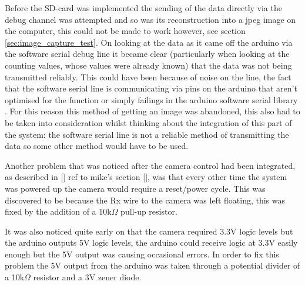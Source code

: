 Before the SD-card was implemented the sending of the data directly via the debug channel was attempted and so was its reconstruction into a jpeg image on the computer, this could not be made to work however, see section \ref{sec:image_capture_test}. On looking at the data as it came off the arduino via the software serial debug line it became clear (particularly when looking at the counting values, whose values were already known) that the data was not being transmitted reliably. This could have been because of noise on the line, the fact that the software serial line is communicating via pins on the arduino that aren't optimised for the function or simply failings in the arduino software serial library \cite{software_serial}. For this reason this method of getting an image was abandoned, this also had to be taken into consideration whilst thinking about the integration of this part of the system: the software serial line is not a reliable method of transmitting the data so some other method would have to be used.

Another problem that was noticed after the camera control had been integrated, as described in [] ref to mike's section [], was that every other time the system was powered up the camera would require a reset/power cycle. This was discovered to be because the Rx wire to the camera was left floating, this was fixed by the addition of a 10k$\Omega$ pull-up resistor.

It was also noticed quite early on that the camera required 3.3V logic \cite{ucam_datasheet} levels but the arduino outputs 5V logic levels, the arduino could receive logic at 3.3V easily enough but the 5V output was causing occasional errors. In order to fix this problem the 5V output from the arduino was taken through a potential divider of a 10k$\Omega$ resistor and a 3V zener diode.